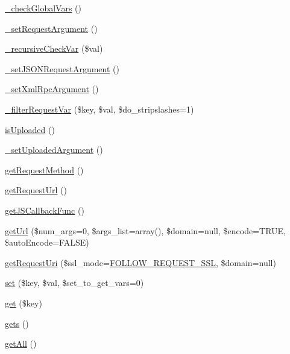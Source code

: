 \begin{DoxyCompactItemize}
\item 
\hyperlink{classContext_a8030f7c76467bfcec812be76f55571cd}{\+\_\+check\+Global\+Vars} ()
\item 
\hyperlink{classContext_acfc274753d9687732458bfaba540c120}{\+\_\+set\+Request\+Argument} ()
\item 
\hyperlink{classContext_aae89f13e0d99577a6cb8a3bac584cee1}{\+\_\+recursive\+Check\+Var} (\$val)
\item 
\hyperlink{classContext_ae07924273ca1b17fe67a7cf978d762fc}{\+\_\+set\+J\+S\+O\+N\+Request\+Argument} ()
\item 
\hyperlink{classContext_abaa9eeef192a9e4b48a06d0af9b1fd05}{\+\_\+set\+Xml\+Rpc\+Argument} ()
\item 
\hyperlink{classContext_a3c411bc0bf786b605af4a7af8ad3ee53}{\+\_\+filter\+Request\+Var} (\$key, \$val, \$do\+\_\+stripslashes=1)
\item 
\hyperlink{classContext_a65ee4d61d0211c8a3f0eeb4251c85892}{is\+Uploaded} ()
\item 
\hyperlink{classContext_a9c821f96670ef47c7139bafc6b39091b}{\+\_\+set\+Uploaded\+Argument} ()
\item 
\hyperlink{classContext_a6912ff86e08ef782a296b77ff1307481}{get\+Request\+Method} ()
\item 
\hyperlink{classContext_ace7f220a4d945de0172f0c1fc98fe31e}{get\+Request\+Url} ()
\item 
\hyperlink{classContext_ab2e157a87d2b960d78b2c3f35ae7da23}{get\+J\+S\+Callback\+Func} ()
\item 
\hyperlink{classContext_aa60b75d32d4923bb3b9854985a82ce36}{get\+Url} (\$num\+\_\+args=0, \$args\+\_\+list=array(), \$domain=null, \$encode=T\+R\+U\+E, \$auto\+Encode=F\+A\+L\+S\+E)
\item 
\hyperlink{classContext_aa79578cfccee4d7f7c4890dc6e36ff90}{get\+Request\+Uri} (\$ssl\+\_\+mode=\hyperlink{Context_8class_8php_a546ef85538017b41b2928e818066989d}{F\+O\+L\+L\+O\+W\+\_\+\+R\+E\+Q\+U\+E\+S\+T\+\_\+\+S\+S\+L}, \$domain=null)
\item 
\hyperlink{classContext_a9f79aa7aecf2e4d8006e517844523fc2}{set} (\$key, \$val, \$set\+\_\+to\+\_\+get\+\_\+vars=0)
\item 
\hyperlink{classContext_a90ce25d65fe6c9778421cbb36ab3def5}{get} (\$key)
\item 
\hyperlink{classContext_ae906c0b1533a8e4ce7836d3665b46288}{gets} ()
\item 
\hyperlink{classContext_a89ad6fd5c093e257e82822d16dc67ac4}{get\+All} ()
\item 

\end{DoxyCompactItemize}
